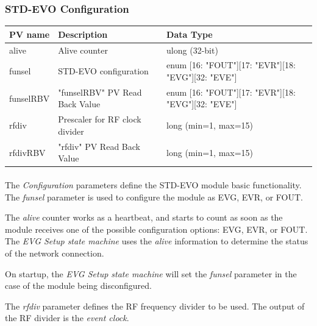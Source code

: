 \documentclass[openany]{article}
\begin{document}
	\etoclocalframed[1]{}

		\subsubsection{STD-EVO Configuration}\label{pvgroup:evg-configuration}
			\begin{center}
			\begin{tabular}{| m{2.8cm} m{6cm} m{6cm} |}
			    \hline
			    \bfseries PV name & \bfseries Description & \bfseries Data Type \\ \hline
			    alive & Alive counter & ulong (32-bit) \\ \hline
			    funsel & STD-EVO configuration & enum [16: "FOUT"][17: "EVR"][18: "EVG"][32: "EVE"] \\ \hline
			    funselRBV & "funselRBV" PV Read Back Value & enum [16: "FOUT"][17: "EVR"][18: "EVG"][32: "EVE"] \\ \hline
			    rfdiv & Prescaler for RF clock divider & long (min=1, max=15) \\ \hline
			    rfdivRBV & "rfdiv" PV Read Back Value & long (min=1, max=15) \\ \hline
			\end{tabular}
			\end{center}

			\paragraph{} The \emph{Configuration} parameters define the STD-EVO module basic functionality. The \emph{funsel} parameter is used to configure the module as EVG, EVR, or FOUT. 
			\par The \emph{alive} counter works as a heartbeat, and starts to count as soon as the module receives one of the possible configuration options: EVG, EVR, or FOUT. The \emph{EVG Setup state machine} uses the \emph{alive} information to determine the status of the network connection.
			\par On startup, the \emph{EVG Setup state machine} will set the \emph{funsel} parameter in the case of the module being disconfigured.
			\par The \emph{rfdiv} parameter defines the RF frequency divider to be used. The output of the RF divider is the \emph{event clock}.
	
\end{document}
